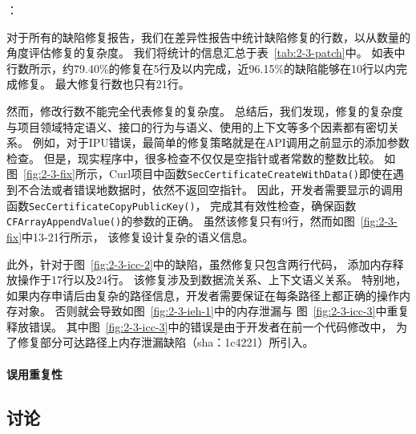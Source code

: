 \vspace*{10pt}
{}：

对于所有的缺陷修复报告，我们在差异性报告中统计缺陷修复的行数，以从数量的角度评估修复的复杂度。
我们将统计的信息汇总于表~\ref{tab:2-3-patch}中。
如表中行数所示，约79.40\%的修复在5行及以内完成，近96.15\%的缺陷能够在10行以内完成修复。
最大修复行数也只有21行。



然而，修改行数不能完全代表修复的复杂度。
总结后，我们发现，修复的复杂度与项目领域特定语义、接口的行为与语义、使用的上下文等多个因素都有密切关系。
例如，对于IPU错误，最简单的修复策略就是在API调用之前显示的添加参数检查。
但是，现实程序中，很多检查不仅仅是空指针或者常数的整数比较。
如图~\ref{fig:2-3-fix}所示，Curl项目中函数\texttt{SecCertificateCreateWithData()}即使在遇到不合法或者错误地数据时，依然不返回空指针。
因此，开发者需要显示的调用函数\texttt{SecCertificateCopyPublicKey()}，
完成其有效性检查，确保函数\texttt{CFArrayAppendValue()}的参数的正确。
虽然该修复只有9行，然而如图~\ref{fig:2-3-fix}中13-21行所示，
该修复设计复杂的语义信息。

此外，针对于图~\ref{fig:2-3-icc-2}中的缺陷，虽然修复只包含两行代码，
添加内存释放操作于17行以及24行。
该修复涉及到数据流关系、上下文语义关系。
特别地，如果内存申请后由复杂的路径信息，开发者需要保证在每条路径上都正确的操作内存对象。
否则就会导致如图~\ref{fig:2-3-ieh-1}中的内存泄漏与
图~\ref{fig:2-3-icc-3}中重复释放错误。
其中图~\ref{fig:2-3-icc-3}中的错误是由于开发者在前一个代码修改中，
为了修复部分可达路径上内存泄漏缺陷（sha：1c4221）所引入。

\vspace*{10pt}
\begin{center}
	\noindent{}
\end{center}



\paragraph{误用重复性}

\subsection{讨论}
